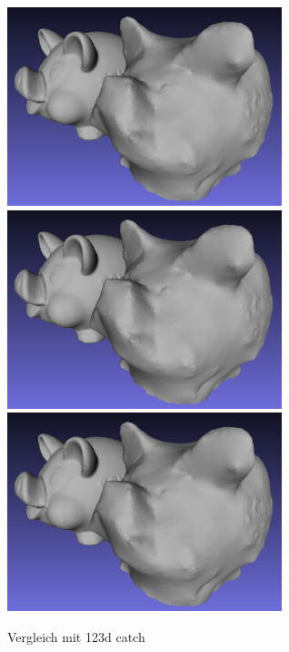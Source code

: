 \documentclass[]{article}
\begin{document}
\begin{figure}[p]
\caption{Vergleich mit 123d catch}
\centering
\includegraphics[width=80mm]{images/sparschwein/123d_Vergleich} %
\includegraphics[width=80mm]{images/sparschwein/123d_Vergleich} %
\includegraphics[width=80mm]{images/sparschwein/123d_Vergleich}
\end{figure}
\end{document}
